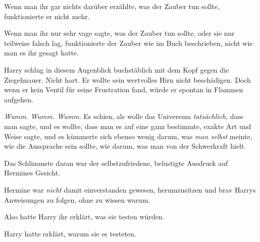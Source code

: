 Wenn man ihr gar nichts darüber erzählte, was der Zauber tun sollte, funktionierte er nicht mehr.

Wenn man ihr nur sehr vage sagte, was der Zauber tun sollte, oder sie nur teilweise falsch lag, funktionierte der Zauber wie im Buch beschrieben, nicht wie man es ihr gesagt hatte.

Harry schlug in diesem Augenblick buchstäblich mit dem Kopf gegen die Ziegelmauer. Nicht hart. Er wollte sein wertvolles Hirn nicht beschädigen. Doch wenn er kein Ventil für seine Frustration fand, würde er spontan in Flammen aufgehen.

\emph{Wumm. Wumm. Wumm.}
Es schien, als wolle das Universum \emph{tatsächlich}, dass man  sagte, und es wollte, dass man es auf eine ganz bestimmte, exakte Art und Weise sagte, und es kümmerte sich ebenso wenig darum, was \emph{man selbst} meinte, wie die Aussprache sein sollte, wie darum, was man von der Schwerkraft hielt.

\emph{}

Das Schlimmste daran war der selbstzufriedene, belustigte Ausdruck auf Hermines Gesicht.

Hermine war \emph{nicht} damit einverstanden gewesen, herumzusitzen und brav Harrys Anweisungen zu folgen, ohne zu wissen warum.

Also hatte Harry ihr erklärt, was sie testen würden.

Harry hatte erklärt, warum sie es testeten.

